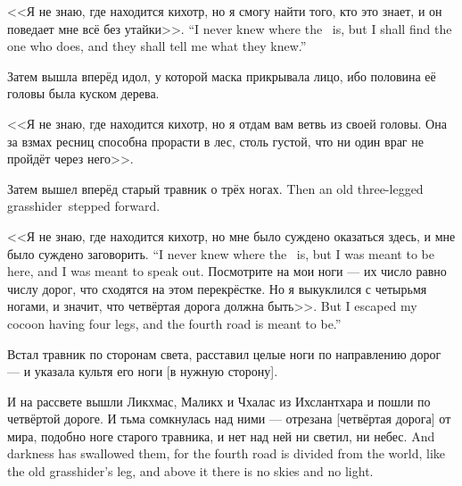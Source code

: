 {<<Я не знаю, где находится кихотр, но я смогу найти того, кто это знает, и он поведает мне всё без утайки>>.}
{``I never knew where the \Kihotr\ is, but I shall find the one who does, and they shall tell me what they knew.''}

Затем вышла вперёд идол, у которой маска прикрывала лицо, ибо половина её головы была куском дерева\FM.

<<Я не знаю, где находится кихотр, но я отдам вам ветвь из своей головы.
Она за взмах ресниц способна прорасти в лес, столь густой, что ни один враг не пройдёт через него>>.

{Затем вышел вперёд старый травник о трёх ногах\FM.}
{Then an old three-legged grasshider\FM\ stepped forward.}

{<<Я не знаю, где находится кихотр, но мне было суждено оказаться здесь, и мне было суждено заговорить.}
{``I never knew where the \Kihotr\ is, but I was meant to be here, and I was meant to speak out.}
Посмотрите на мои ноги --- их число равно числу дорог, что сходятся на этом перекрёстке.
{Но я выкуклился с четырьмя ногами, и значит, что четвёртая дорога должна быть>>.}
{But I escaped my cocoon having four legs, and the fourth road is meant to be.''}

Встал травник по сторонам света, расставил целые ноги по направлению дорог --- и указала культя его ноги [в нужную сторону].

И на рассвете вышли Ликхмас, Маликх и Чхалас из Ихслантхара и пошли по четвёртой дороге\FM.
{И тьма сомкнулась над ними --- отрезана [четвёртая дорога] от мира, подобно ноге старого травника, и нет над ней ни светил, ни небес.}
{And darkness has swallowed them, for the fourth road is divided from the world, like the old grasshider's leg, and above it there is no skies and no light.}

